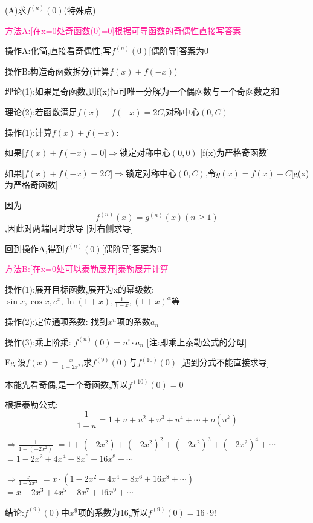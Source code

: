 \documentclass[11pt,a4paper,UTF8]{ctexart}
\begin{document}
\textit{}(A)求$f^(n)(0)$(特殊点)\textit{}   

\textcolor{DeepPink}{方法A:[在x=0处奇函数(0)=0]根据可导函数的奇偶性直接写答案}

\begin{solbox}[分步推导与答题规范]
操作A:化简,直接看奇偶性,写$f^{(n)}(0)$[偶阶导]答案为0

操作B:构造奇函数拆分(计算$f(x) + f(-x)$)

  理论(1):如果是奇函数,则f(x)恒可唯一分解为一个偶函数与一个奇函数之和

  理论(2):若函数满足$f(x) + f(-x) = 2C$,对称中心$(0, C)$

  操作(1):计算$f(x) + f(-x)$:

  	如果[$f(x) + f(-x) = 0$]$\Rightarrow$锁定对称中心$(0, 0)$		  [f(x)为严格奇函数]

  	如果[$f(x) + f(-x) = 2C$]$\Rightarrow$锁定对称中心$(0, C)$,令$g(x) = f(x) - C$[g(x)为严格奇函数]

  	因为
\begin{equation*}
f^{(n)}(x) = g^{(n)}(x) (n \ge 1)
\end{equation*}
,因此对两端同时求导		[对右侧求导]

  	回到操作A,得到$f^{(n)}(0)$[偶阶导]答案为0
\end{solbox}

\textcolor{DeepPink}{方法B:[在x=0处可以泰勒展开]泰勒展开计算}

\begin{solbox}[分步推导与答题规范]
操作(1):展开目标函数,展开为x的幂级数:	$\sin x, \cos x, e^x, \ln(1+x), \frac{1}{1-x}, (1+x)^\alpha$等

操作(2):定位通项系数:    	          找到$x^n$项的系数$a_n$

操作(3):乘上阶乘:			$f^{(n)}(0) = n! \cdot a_n$  [注:即乘上泰勒公式的分母]

Eg:设$f(x) = \frac{x}{1 + 2x^2}$,求$f^{(9)}(0)$与$f^{(10)}(0)$			   [遇到分式不能直接求导]

本能先看奇偶,是一个奇函数,所以$f^{(10)}(0)=0$

根据泰勒公式:
\begin{equation*}
\frac{1}{1-u} = 1 + u + u^2 + u^3 + u^4 + \cdots + o(u^k)
\end{equation*}


$\Rightarrow\frac{1}{1 - (-2x^2)}$ $= 1 + (-2x^2) + (-2x^2)^2 + (-2x^2)^3 + (-2x^2)^4 + \cdots$ $= 1 - 2x^2 + 4x^4 - 8x^6 + 16x^8 + \cdots$

$\Rightarrow \frac{x}{1 + 2x^2}$ $= x \cdot \left(1 - 2x^2 + 4x^4 - 8x^6 + 16x^8 + \cdots\right)$       $= x - 2x^3 + 4x^5 - 8x^7 + 16x^9 + \cdots$

结论:$f^{(9)}(0)$中$x^9$项的系数为16,所以$f^{(9)}(0)=16\cdot 9!$
\end{solbox}
\end{document}
